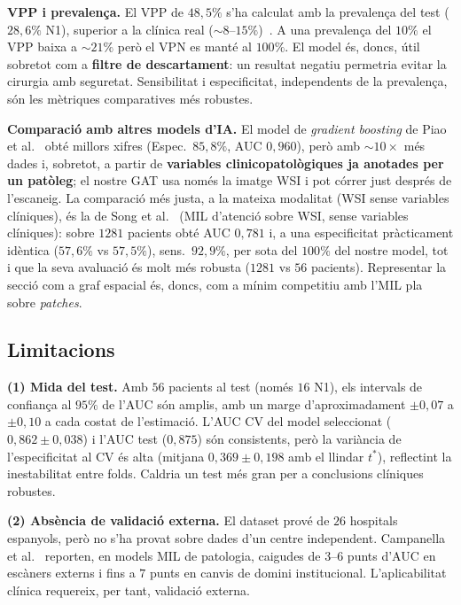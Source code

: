 \documentclass[10pt,a4paper,twocolumn,twoside]{article}
\begin{document}
\textbf{VPP i prevalença.} El VPP de $48{,}5\%$ s'ha calculat amb la prevalença del test
($28{,}6\%$ N1), superior a la clínica real ($\sim\!8$–$15\%$)~\cite{zaffalon2023}. A una
prevalença del $10\%$ el VPP baixa a $\sim\!21\%$ però el VPN es manté al $100\%$. El model
és, doncs, útil sobretot com a \textbf{filtre de descartament}: un resultat negatiu permetria
evitar la cirurgia amb seguretat. Sensibilitat i especificitat, independents de la prevalença,
són les mètriques comparatives més robustes.

\textbf{Comparació amb altres models d'IA.} El model de \textit{gradient boosting} de Piao et
al.~\cite{piao2023ai} obté millors xifres (Espec.\ $85{,}8\%$, AUC $0{,}960$), però amb
$\sim\!10\!\times$ més dades i, sobretot, a partir de \textbf{variables clinicopatològiques ja
anotades per un patòleg}; el nostre GAT usa només la imatge WSI i pot córrer just després de
l'escaneig. La comparació més justa, a la mateixa modalitat (WSI sense variables clíniques), és la de Song et
al.~\cite{song2024lnm} (MIL d'atenció sobre WSI, sense variables clíniques): sobre $1281$
pacients obté AUC $0{,}781$ i, a una especificitat pràcticament idèntica ($57{,}6\%$ vs
$57{,}5\%$), sens.\ $92{,}9\%$, per sota del $100\%$ del nostre model, tot i que la seva
avaluació és molt més robusta ($1281$ vs $56$ pacients). Representar la secció com a graf
espacial és, doncs, com a mínim competitiu amb l'MIL pla sobre \textit{patches}.

\subsection{Limitacions}
\label{sec:limitacions}

\textbf{(1) Mida del test.}
Amb $56$ pacients al test (només $16$ N1), els intervals de confiança al $95\%$ de l'AUC
són amplis, amb un marge d'aproximadament $\pm0{,}07$ a $\pm0{,}10$ a cada costat de l'estimació. L'AUC CV del model seleccionat ($0{,}862\!\pm\!0{,}038$)
i l'AUC test ($0{,}875$) són consistents, però la variància de l'especificitat al CV és alta
(mitjana $0{,}369\!\pm\!0{,}198$ amb el llindar $t^*$), reflectint la inestabilitat
entre folds. Caldria un test més gran per a conclusions clíniques robustes.

\textbf{(2) Absència de validació externa.}
El dataset prové de $26$ hospitals espanyols, però no s'ha provat sobre dades d'un centre
independent. Campanella et al.~\cite{campanella2019} reporten, en models MIL de patologia,
caigudes de $3$–$6$ punts d'AUC en escàners externs i fins a $7$ punts en canvis de
domini institucional. L'aplicabilitat clínica requereix, per tant, validació externa.
\end{document}
